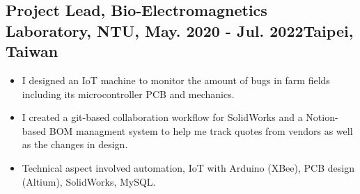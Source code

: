\documentclass[12pt]{article}
\begin{document}
        \subsection*{Project Lead, Bio-Electromagnetics Laboratory, NTU, May. 2020 - Jul. 2022\hfill Taipei, Taiwan}
        { \small
        \begin{itemize}
            \item I designed an IoT machine to monitor the amount of bugs in farm fields including its microcontroller PCB and mechanics.
            \item I created a git-based collaboration workflow for SolidWorks and a Notion-based BOM managment system to help me track quotes from vendors as well as the changes in design.
            \item Technical aspect involved automation, IoT with Arduino (XBee), PCB design (Altium), SolidWorks, MySQL.
        \end{itemize}
        }
        
        
\end{document}
